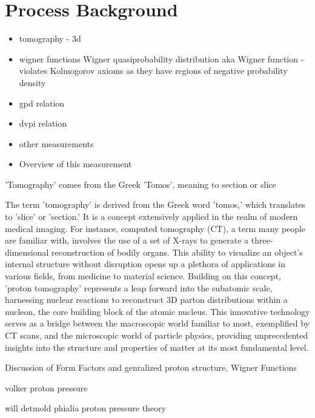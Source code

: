 \section{Process Background}

    \begin{itemize}
        \item tomography - 3d
        \item wigner functions Wigner quasiprobability distribution aka Wigner function - violates Kolmogorov axioms as they have regions of negative probability density
        \item gpd relation
        \item dvpi relation
        \item other measurements
        \item Overview of this measurement
    \end{itemize}
    
    'Tomography' comes from the Greek 'Tomos', meaning to section or slice


    The term 'tomography' is derived from the Greek word 'tomos,' which translates to 'slice' or 'section.' It is a concept extensively applied in the realm of modern medical imaging. For instance, computed tomography (CT), a term many people are familiar with, involves the use of a set of X-rays to generate a three-dimensional reconstruction of bodily organs. This ability to visualize an object's internal structure without disruption opens up a plethora of applications in various fields, from medicine to material science. Building on this concept, 'proton tomography' represents a leap forward into the subatomic scale, harnessing nuclear reactions to reconstruct 3D parton distributions within a nucleon, the core building block of the atomic nucleus. This innovative technology serves as a bridge between the macroscopic world familiar to most, exemplified by CT scans, and the microscopic world of particle physics, providing unprecedented insights into the structure and properties of matter at its most fundamental level.


    
    Discussion of Form Factors and genralized proton structure, Wigner Functions


volker proton pressure \cite{Burkert2018TheProton}

will detmold phialia proton pressure theory \cite{Shanahan2019PressureProton}


